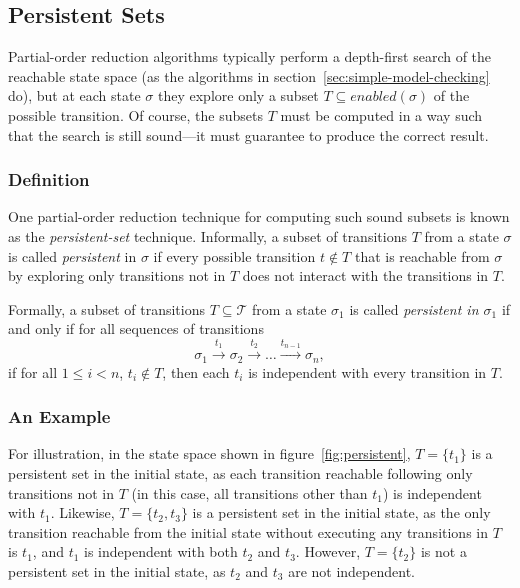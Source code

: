 \documentclass[12pt,a4paper,twoside,openright]{report}
\begin{document}
\subsection{Persistent Sets}
\label{sec:persistent}

Partial-order reduction algorithms typically 
perform a depth-first
search of the reachable state space
(as the algorithms in
section~\ref{sec:simple-model-checking} do), but at each
state $\sigma$ they explore only a subset
$T \subseteq \textit{enabled}(\sigma)$ of the possible transition.
Of course, the subsets
$T$ must be computed in a way such that the search
is still sound---it must guarantee to
produce the correct result.

\subsubsection{Definition}
One partial-order reduction technique for
computing such sound subsets is known
as the \emph{persistent-set} technique. Informally,
a subset of transitions $T$ from a state $\sigma$
is called \emph{persistent} in $\sigma$ if every
possible transition $t \not \in T$ that is reachable
from $\sigma$ by exploring only transitions not in
$T$ does not interact with the transitions
in $T$.

Formally, a subset of transitions $T \subseteq \mathcal{T}$
from a state $\sigma_1$
is called \emph{persistent in $\sigma_1$} if and only if
for all sequences of transitions
\[
	\sigma_1 \xrightarrow{\ t_1\ } \sigma_2 \xrightarrow{\ t_2\ } \ldots
	\xrightarrow{t_{n-1}} \sigma_n,
\]
if for all $1 \leq i < n$, $t_i \not \in T$, then each $t_i$ is
independent with every transition in $T$.

\subsubsection{An Example}
For illustration, in the state space shown in
figure~\ref{fig:persistent}, $T = \{t_1\}$ is
a persistent set in the initial state, as each
transition reachable following only transitions
not in $T$ (in this case, all transitions other
than $t_1$) is independent with $t_1$.
Likewise, $T = \{t_2, t_3\}$ is
a persistent set in the initial state, as the
only transition reachable from the initial state
without executing any transitions in $T$ is $t_1$,
and $t_1$ is independent with both $t_2$ and $t_3$.
However, $T = \{t_2\}$ is not a persistent set in the
initial state, as $t_2$ and $t_3$ are not independent.
\end{document}
